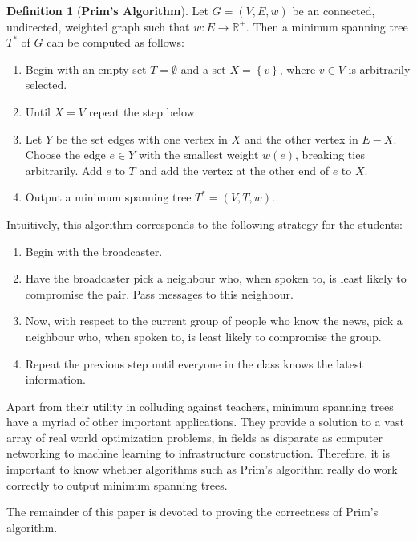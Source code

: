 \documentclass[a4paper,11pt]{report}
\theoremstyle{plain}
\theoremstyle{definition}
\newtheorem{defn}[thm]{Definition}
\begin{document}
\begin{defn}[{\bfseries Prim's Algorithm}] Let $G = (V, E, w)$ be an
connected, undirected, weighted graph such that $w : E \to \mathbb{R}^+$.
Then a minimum spanning tree $T^*$ of $G$ can be computed as follows:
\begin{enumerate}
    \item Begin with an empty set $T = \emptyset$ and a set $X
    = \left\{v\right\}$, where $v \in V$ is arbitrarily selected.
    \item Until $X = V$ repeat the step below.
    \item Let $Y$ be the set edges with one vertex in $X$ and the other
    vertex in $E - X$. Choose the edge $e \in Y$ with the smallest weight
    $w(e)$, breaking ties arbitrarily. Add $e$ to $T$ and add the vertex at
    the other end of $e$ to $X$.
    \item Output a minimum spanning tree $T^* = (V, T, w)$.
\end{enumerate}
\end{defn}

Intuitively, this algorithm corresponds to the following strategy for the
students:

\begin{enumerate}
    \item Begin with the broadcaster.
    \item Have the broadcaster pick a neighbour who, when spoken to, is least
    likely to compromise the pair. Pass messages to this neighbour.
    \item Now, with respect to the current group of people who know the news,
    pick a neighbour who, when spoken to, is least likely to compromise the
    group.
    \item Repeat the previous step until everyone in the class knows the latest
    information.
\end{enumerate}

Apart from their utility in colluding against teachers, minimum spanning
trees have a myriad of other important applications. They provide a solution
to a vast array of real world optimization problems, in fields as disparate
as computer networking to machine learning to infrastructure construction.
Therefore, it is important to know whether algorithms such as Prim's algorithm
really do work correctly to output minimum spanning trees.

The remainder of this paper is devoted to proving the correctness of
Prim's algorithm.
\end{document}
